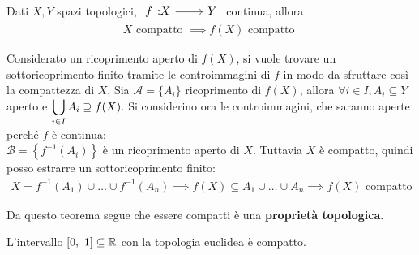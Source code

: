 \begin{theorema}\label{immagine compatto}
	Dati $X,Y$ spazi topologici, $\funz f X Y$ continua, allora
		\begin{gather*}
			X \text{ compatto } \implies f(X) \text{ compatto }
		\end{gather*}
	\vspace{-6mm}
\end{theorema}
\begin{demonstration}
	Considerato un ricoprimento aperto di $f(X)$, si vuole trovare un sottoricoprimento finito tramite le controimmagini di $f$ in modo da sfruttare così la compattezza di $X$. \newline
	Sia  $\mathcal{A}=\{A_i\}$ ricoprimento di $f(X)$, allora $\forall i\in I, A_i\subseteq Y$ aperto e $\displaystyle \mathop{{\bigcup}}\displaylimits_{i\in I}A_i \supseteq f(X)$. \newline
	Si considerino ora le controimmagini, che saranno aperte perché $f$ è continua:\\ $\mathcal{B}=\left\{f^{-1}(A_i)\right\}$ è un ricoprimento aperto di $X$. Tuttavia $X$ è compatto, quindi posso estrarre un sottoricoprimento finito:
		\begin{gather*}
			X=f^{-1}(A_1) \cup	\dots \cup f^{-1}(A_n) \implies f(X)\subseteq A_1\cup \dots \cup A_n \implies f(X) \text{ compatto}
		\end{gather*}
	\vspace{-6mm}
\end{demonstration}
Da questo teorema segue che essere compatti è una \textbf{proprietà topologica}.
\begin{theorema}
	L'intervallo $[0,\ 1]\subseteq\realset$ con la topologia euclidea è compatto.
\end{theorema}
